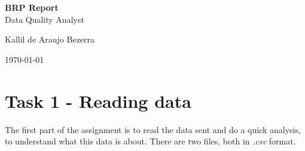 \documentclass[a4paper, 12pt]{article}
\begin{document}

\begin{titlepage}
	\begin{center}
	

		\textbf{\Large{BRP Report}}\\
		\large{Data Quality Analyst}\\ 
		\vspace{15pt}
        \vspace{95pt}
		\vspace{3,5cm}
	\end{center}
	
	\begin{flushleft}
		\begin{tabbing}
			Kallil de Araujo Bezerra \\
	\end{tabbing}
 \end{flushleft}
	\vspace{1cm}
	
	\begin{center}
		\vspace{\fill}
			\today
	\end{center}
\end{titlepage}


\newpage
\tableofcontents
\thispagestyle{empty}

\newpage
{}
\section{Task 1 - Reading data}

The first part of the assignment is to read the data sent and do a quick analysis, to understand what this data is about. There are two files, both in \textit{.csv} format.
\end{document}
